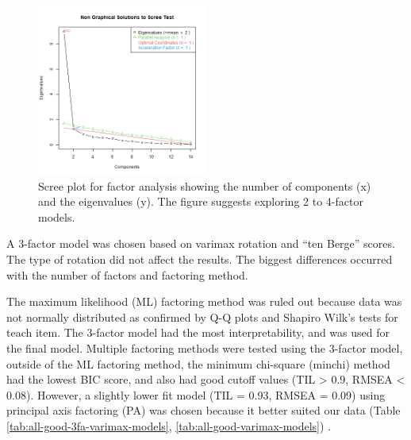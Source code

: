 \documentclass[020-persona\_validation.tex]{subfiles}
\begin{document}
        \begin{figure}[!hbtp]
            \centering
            \includegraphics[width=0.5\textwidth]{figs/010-validation/efa_eigen_scree_good.png}
            \caption[Scree plot for factor analysis]
            {Scree plot for factor analysis showing the number of components (x) and the eigenvalues (y).
                The figure suggests exploring 2 to 4-factor models.
            }
            \label{fig:scree-fa-good}
        \end{figure}

        A 3-factor model was chosen based on
        varimax rotation and
        ``ten Berge'' scores.
        The type of rotation did not affect the results.
        The biggest differences occurred with the number of factors and factoring method.

        The maximum likelihood (ML) factoring method was ruled out because data was not normally distributed
        as confirmed by Q-Q plots and Shapiro Wilk's tests for teach item. %
        The 3-factor model had the most interpretability, and was used for the final model.
        Multiple factoring methods were tested using the 3-factor model,
        outside of the ML factoring method, the minimum chi-square (minchi) method had the lowest BIC score,
        and also had good cutoff values (TIL > 0.9, RMSEA < 0.08).
        However, a slightly lower fit model (TIL = 0.93, RMSEA = 0.09) using principal axis factoring (PA)
        was chosen because it better suited our data
        (Table \ref{tab:all-good-3fa-varimax-models}, \ref{tab:all-good-varimax-models})
        \cite{arifinExploratoryFactorAnalysis2017, brownConfirmatoryFactorAnalysis2015}.
\end{document}
